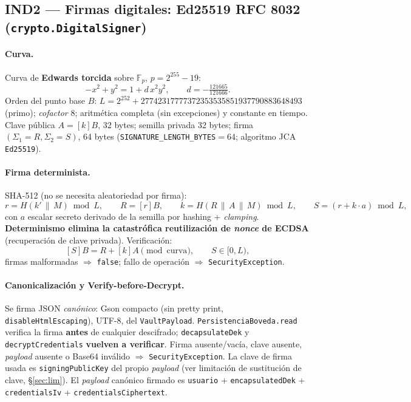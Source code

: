 \documentclass[11pt,a4paper]{article}
\newcommand{\Fp}{\mathbb{F}_p}
\begin{document}
\subsection{IND2 --- Firmas digitales: Ed25519 RFC 8032 (\texttt{crypto.DigitalSigner})}
\paragraph{Curva.} Curva de \textbf{Edwards torcida} sobre $\Fp$, $p = 2^{255}-19$:
\[
  -x^2 + y^2 = 1 + d\,x^2 y^2,\qquad d = -\tfrac{121665}{121666}.
\]
Orden del punto base $B$: $L = 2^{252} + 27742317777372353535851937790883648493$
(primo); \emph{cofactor} 8; aritmética completa (sin excepciones) y constante en
tiempo. Clave pública $A = [k]B$, 32 bytes; semilla privada 32 bytes; firma
$(\Sigma_1=R,\Sigma_2=S)$, 64 bytes (\texttt{SIGNATURE\_LENGTH\_BYTES}$=64$;
algoritmo JCA \texttt{Ed25519}).
\paragraph{Firma determinista.} SHA-512 (no se necesita aleatoriedad por firma):
\[
  r = H(k' \,\|\, M) \bmod L,\qquad R = [r]B,\qquad
  k = H(R \,\|\, A \,\|\, M) \bmod L,\qquad
  S = (r + k\cdot a) \bmod L,
\]
con $a$ escalar secreto derivado de la semilla por hashing + \emph{clamping}.
\textbf{Determinismo elimina la catastrófica reutilización de \emph{nonce} de
ECDSA} (recuperación de clave privada). Verificación:
\[
  [S]B = R + [k]A \pmod{\text{curva}},\qquad S \in [0, L),
\]
firmas malformadas $\Rightarrow$ \texttt{false}; fallo de operación $\Rightarrow$
\texttt{SecurityException}.
\paragraph{Canonicalización y Verify-before-Decrypt.} Se firma JSON
\emph{canónico}: Gson compacto (sin pretty print, \texttt{disableHtmlEscaping}),
UTF-8, del \texttt{VaultPayload}. \texttt{PersistenciaBoveda.read} verifica la
firma \textbf{antes} de cualquier descifrado; \texttt{decapsulateDek} y
\texttt{decryptCredentials} \textbf{vuelven a verificar}. Firma ausente/vacía,
clave ausente, \emph{payload} ausente o Base64 inválido $\Rightarrow$
\texttt{SecurityException}. La clave de firma usada es \texttt{signingPublicKey}
del propio \emph{payload} (ver limitación de sustitución de clave, §\ref{sec:lim}).
El \emph{payload} canónico firmado es \texttt{usuario} + \texttt{encapsulatedDek}
+ \texttt{credentialsIv} + \texttt{credentialsCiphertext}.
\end{document}
